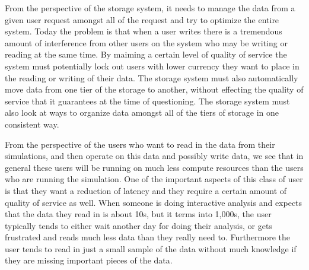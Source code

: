 From the perspective of the storage system, it needs to manage the data from a given user request amongst all of the request and try to optimize the entire system. Today the problem is that
when a user writes there is a tremendous amount of interference from other users on the system who may be writing or reading at the same time. By maiming a certain level of quality of service
the system must potentially lock out users with lower currency they want to place in the reading or writing of their data.  The storage system must also automatically move data from one tier of the
storage to another, without effecting the quality of service that it guarantees at the time of questioning. The storage system must also look at ways to organize data amongst all of the tiers of
storage in one consistent way. 

From the perspective of the users who want to read in the data from their simulations, and then operate on this data and possibly write data, we
see that in general these users will be running on much less compute resources than the users who are running the simulation. One of the
important aspects of this class of user is that they want a reduction of latency and they require a certain amount of quality of service as well. 
When someone is doing interactive analysis and expects that the data they read in is about 10s, but it terms into 1,000s, the user typically
tends to either wait another day for doing their analysis, or gets frustrated and reads much less data than they really need to. Furthermore
the user tends to read in just a small sample of the data without much knowledge if they are missing important pieces of the data. 


